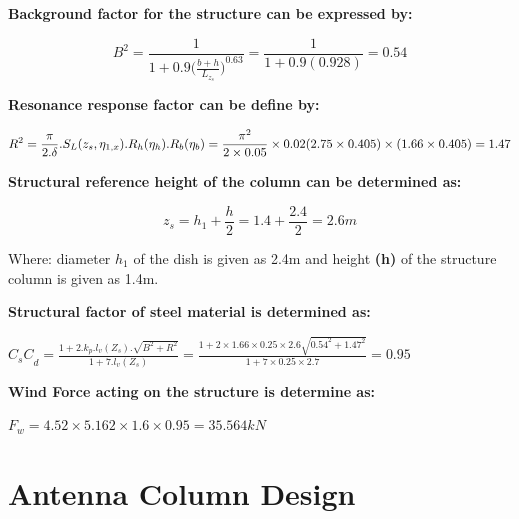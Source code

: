 {\textbf{Background factor for the structure can be expressed by:}

\begin{equation}
B^2 = \frac{1}{1+0.9({\frac{b+h}{L_{z_s}})}^{0.63}}  = \frac{1}{1+0.9(0.928)} = 0.54
\end{equation}


\textbf{Resonance response factor can be define by:}

\begin{equation}
R^2 = \frac{\pi}{2.\delta} .S_L(z_s,\eta_{1,x}).R_h(\eta_h).R_b(\eta_b)
=\frac{\pi^2}{2\times0.05} \times 0.02(2.75\times0.405)\times(1.66\times0.405) = 1.47\\
\end{equation}

\textbf{Structural reference height of the column can be determined as:}

\begin{equation}
z_s = h_1 \plus \frac{h}{2} = 1.4 \plus \frac{2.4}{2} = 2.6m
\end{equation}

Where: diameter \textbf{\(h_1\)} of the dish  is given as 2.4m  and height \textbf{(h)} of the structure column is given as 1.4m.

\textbf{Structural factor of steel material is determined as:}
\begin{center}
    \({{C}_{s}{C}}_{d} = \frac{1+2.k_p.l_v\left(Z_s\right).\sqrt{B^2+R^2}}{1+7.l_v\left(Z_s\right)}  = \frac{1 + 2 \times 1.66 \times 0.25\times 2.6 \sqrt{{0.54}^2+{1.47}^2}}{1 + 7 \times0.25\times2.7}  = 0.95\)
\end{center}




\textbf{Wind Force acting on the structure is determine as:}

\begin{center}
    \({F}_{w} = 4.52 \times 5.162 \times 1.6 \times 0.95 = 35.564kN \)
\end{center}





\section{Antenna Column Design}

    
}
